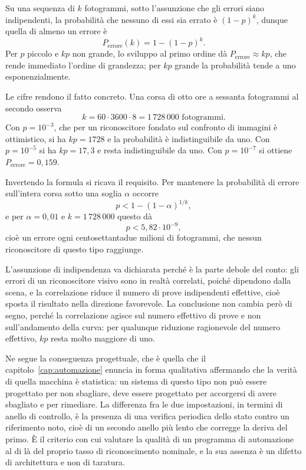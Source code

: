 Su una sequenza di $k$ fotogrammi, sotto l'assunzione che gli errori siano indipendenti, la probabilità che nessuno di essi sia errato è $(1-p)^k$, dunque quella di almeno un errore è
\[
P_{\text{errore}}(k) = 1 - (1-p)^k.
\]
Per $p$ piccolo e $kp$ non grande, lo sviluppo al primo ordine dà $P_{\text{errore}} \approx kp$, che rende immediato l'ordine di grandezza; per $kp$ grande la probabilità tende a uno esponenzialmente.

Le cifre rendono il fatto concreto. Una corsa di otto ore a sessanta fotogrammi al secondo osserva
\[
k = 60 \cdot 3600 \cdot 8 = 1\,728\,000 \text{ fotogrammi}.
\]
Con $p = 10^{-3}$, che per un riconoscitore fondato sul confronto di immagini è ottimistico, si ha $kp = 1728$ e la probabilità è indistinguibile da uno. Con $p = 10^{-5}$ si ha $kp = 17{,}3$ e resta indistinguibile da uno. Con $p = 10^{-7}$ si ottiene $P_{\text{errore}} = 0{,}159$.

Invertendo la formula si ricava il requisito. Per mantenere la probabilità di errore sull'intera corsa sotto una soglia $\alpha$ occorre
\[
p < 1 - (1-\alpha)^{1/k},
\]
e per $\alpha = 0{,}01$ e $k = 1\,728\,000$ questo dà
\[
p < 5{,}82 \cdot 10^{-9},
\]
cioè un errore ogni centosettantadue milioni di fotogrammi, che nessun riconoscitore di questo tipo raggiunge.

L'assunzione di indipendenza va dichiarata perché è la parte debole del conto: gli errori di un riconoscitore visivo sono in realtà correlati, poiché dipendono dalla scena, e la correlazione riduce il numero di prove indipendenti effettive, cioè sposta il risultato nella direzione favorevole. La conclusione non cambia però di segno, perché la correlazione agisce sul numero effettivo di prove e non sull'andamento della curva: per qualunque riduzione ragionevole del numero effettivo, $kp$ resta molto maggiore di uno.

Ne segue la conseguenza progettuale, che è quella che il capitolo~\ref{cap:automazione} enuncia in forma qualitativa affermando che la verità di quella macchina è statistica: un sistema di questo tipo non può essere progettato per non sbagliare, deve essere progettato per accorgersi di avere sbagliato e per rimediare. La differenza fra le due impostazioni, in termini di anello di controllo, è la presenza di una verifica periodica dello stato contro un riferimento noto, cioè di un secondo anello più lento che corregge la deriva del primo. È il criterio con cui valutare la qualità di un programma di automazione al di là del proprio tasso di riconoscimento nominale, e la sua assenza è un difetto di architettura e non di taratura.

